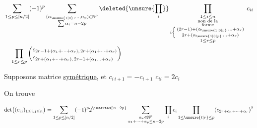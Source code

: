 \[
\begin{aligned}
&\sum_{1\le p\le[n/2]}(-1)^p
\sum_{\substack{(\alpha_{\unsure{1|0}},\ldots,\alpha_p)\in\mathbb N^p\\\sum\alpha_i=n-2p}}
\deleted{\unsure{\prod_i}}
\prod_{\substack{1\le i\le n\\\text{non de la}\\\text{forme}\\
i\left\{\begin{smallmatrix}(2r-1)+(\alpha_{\unsure{1|0|p}}\,\ldots+\alpha_r)\\
2r+(\alpha_{\unsure{1|0|p}}\,\ldots+\alpha_r)\end{smallmatrix}\right.\\1\le r\le p}}
c_{ii}\\
&\quad\prod_{1\le r\le p}
\left(\begin{aligned}
&c_{2r-1+(\alpha_1+\cdots+\alpha_r),\,2r+(\alpha_1+\cdots+\alpha_r)}\\[-2pt]
&c_{2r+(\alpha_1+\cdots+\alpha_r),\,2r-1+(\alpha_1\ldots+\alpha_r)}
\end{aligned}\right)
\end{aligned}
\]

Supposons matrice \uline{symétrique}, et $c_{i\,i+1}=-c_{i+1}$ \quad $c_{ii}=2c_i$

On trouve

\[
\det\bigl((c_{ij})_{1\le i,j\le n}\bigr)=
\sum_{1\le p\le[n/2]}(-1)^p2^{\inserted{n-2p}}
\sum_{\substack{\alpha_*\in\mathbb N^p\\\alpha_1+\cdots+\alpha_p\le n-2p}}
\prod_i c_i\prod_{1\le\unsure{t|r}\le p}
(c_{2r+\alpha_1+\cdots+\alpha_r})^2
\]


